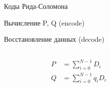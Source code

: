 \documentclass[aspectratio=169]{beamer}
\begin{document}
\begin{frame}{Коды Рида-Соломона}
\stripe

    \begin{minipage}{.48\textwidth}
        Вычисление P, Q (encode)
    \end{minipage}
    \begin{minipage}{.48\textwidth}
        Восстановление данных (decode)
    \end{minipage}

\begin{columns}[T]
    \begin{column}{.48\textwidth}
    \begin{minipage}[t][.5\textheight][t]{\textwidth}
        \begin{align*}
            P &= \sum_{i=0}^{N-1} D_i \\
            Q &= \sum_{i=0}^{N-1} q_i D_i
        \end{align*}
    \end{minipage}
    \end{column}

    
    \begin{column}{.48\textwidth}
    \begin{minipage}[t][.5\textheight][t]{\textwidth}

        


\end{minipage}
\end{column}
\end{columns}
\end{frame}
\end{document}
